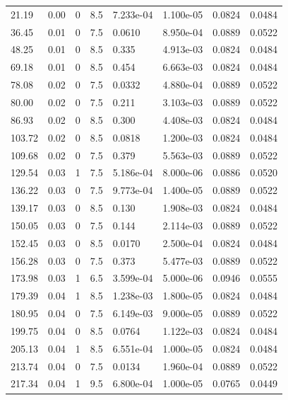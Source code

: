 \documentclass[preview]{standalone}
\begin{document}
{{\begin{tabular}{L{1.2cm}C{1.2cm} C{0.3cm}C{0.5cm} C{1.4cm}C{1.4cm} C{1.4cm}C{1.4cm}}
  21.19  &  0.00  & 0     & 8.5 &  7.233e-04  & 1.100e-05  & 0.0824 &  0.0484   \\ 
  36.45  &  0.01  & 0     & 7.5 &  0.0610  & 8.950e-04  & 0.0889 &  0.0522   \\ 
  48.25  &  0.01  & 0     & 8.5 &  0.335  & 4.913e-03  & 0.0824 &  0.0484   \\ 
  69.18  &  0.01  & 0     & 8.5 &  0.454  & 6.663e-03  & 0.0824 &  0.0484   \\ 
  78.08  &  0.02  & 0     & 7.5 &  0.0332  & 4.880e-04  & 0.0889 &  0.0522   \\ 
  80.00  &  0.02  & 0     & 7.5 &  0.211  & 3.103e-03  & 0.0889 &  0.0522   \\ 
  86.93  &  0.02  & 0     & 8.5 &  0.300  & 4.408e-03  & 0.0824 &  0.0484   \\ 
  103.72  &  0.02  & 0     & 8.5 &  0.0818  & 1.200e-03  & 0.0824 &  0.0484   \\ 
  109.68  &  0.02  & 0     & 7.5 &  0.379  & 5.563e-03  & 0.0889 &  0.0522   \\ 
  129.54  &  0.03  & 1     & 7.5 &  5.186e-04  & 8.000e-06  & 0.0886 &  0.0520   \\ 
  136.22  &  0.03  & 0     & 7.5 &  9.773e-04  & 1.400e-05  & 0.0889 &  0.0522   \\ 
  139.17  &  0.03  & 0     & 8.5 &  0.130  & 1.908e-03  & 0.0824 &  0.0484   \\ 
  150.05  &  0.03  & 0     & 7.5 &  0.144  & 2.114e-03  & 0.0889 &  0.0522   \\ 
  152.45  &  0.03  & 0     & 8.5 &  0.0170  & 2.500e-04  & 0.0824 &  0.0484   \\ 
  156.28  &  0.03  & 0     & 7.5 &  0.373  & 5.477e-03  & 0.0889 &  0.0522   \\ 
  173.98  &  0.03  & 1     & 6.5 &  3.599e-04  & 5.000e-06  & 0.0946 &  0.0555   \\ 
  179.39  &  0.04  & 1     & 8.5 &  1.238e-03  & 1.800e-05  & 0.0824 &  0.0484   \\ 
  180.95  &  0.04  & 0     & 7.5 &  6.149e-03  & 9.000e-05  & 0.0889 &  0.0522   \\ 
  199.75  &  0.04  & 0     & 8.5 &  0.0764  & 1.122e-03  & 0.0824 &  0.0484   \\ 
  205.13  &  0.04  & 1     & 8.5 &  6.551e-04  & 1.000e-05  & 0.0824 &  0.0484   \\ 
  213.74  &  0.04  & 0     & 7.5 &  0.0134  & 1.960e-04  & 0.0889 &  0.0522   \\ 
  217.34  &  0.04  & 1     & 9.5 &  6.800e-04  & 1.000e-05  & 0.0765 &  0.0449   \\ 

\end{tabular}}}
\end{document}
